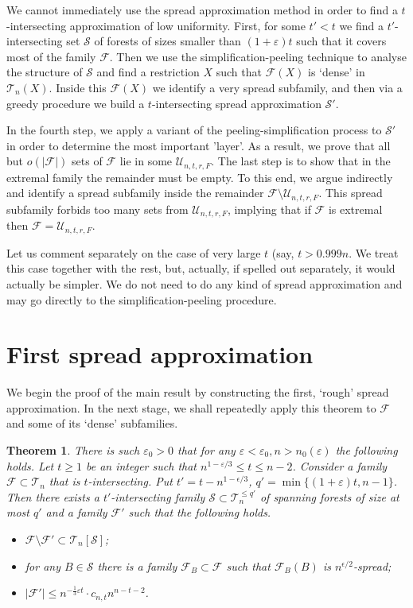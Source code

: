\documentclass[11pt,letterpaper]{amsart}
\newcommand{\eps}{\varepsilon}
\renewcommand{\le}{\leqslant}
\renewcommand{\ge}{\geqslant}
\newcommand{\ff}{\mathcal{F}}
\newcommand{\s}{\mathcal{S}}
\newcommand{\uu}{\mathcal U}
\newcommand{\T}{\mathcal{T}}
\newtheorem{theorem}{Theorem}
\begin{document}
We cannot immediately use the spread approximation method in order to find a $t$-intersecting approximation of low uniformity. First, for some $t'<t$ we find a $t'$-intersecting set $\s$ of forests of sizes smaller than $(1 + \eps)t$ such that it covers most of the family $\ff$. Then we use the simplification-peeling technique to analyse the structure of $\s$ and find a restriction $X$ such that $\ff(X)$ is `dense' in $\T_n(X)$. Inside this $\ff(X)$ we identify a very spread subfamily, and then via a greedy procedure we build a $t$-intersecting spread approximation $\s'$.

In the fourth step, we apply a variant of the peeling-simplification process to $\s'$ in order to determine the most important 'layer'. As a result, we prove that all but $o(|\ff|)$ sets of $\ff$ lie in some $\uu_{n, t, r, F}$. The last step is to show that in the extremal family the remainder must be empty. To this end, we argue indirectly and identify a spread subfamily inside  the remainder $\ff\setminus \uu_{n, t , r, F}$. This spread subfamily  forbids too many sets from $\uu_{n, t , r, F}$, implying that if $\ff$ is extremal then  $\ff = \uu_{n, t, r, F}.$

Let us comment separately on the case of very large $t$ (say, $t>0.999n$. We treat this case together with the rest, but, actually, if spelled out separately, it would actually be simpler. We do not need to do any kind of spread approximation and may go directly to the simplification-peeling procedure. 

\section{First spread approximation}

We begin the proof of the main result by constructing the first, `rough' spread approximation. In the next stage, we shall repeatedly apply this theorem to $\ff$ and some of its `dense' subfamilies.

\begin{theorem}\label{1SA}
  There is such $\eps_0 > 0$ that for any $\eps < \eps_0, n > n_0(\eps)$ the following holds. Let $t\ge1$ be an integer such that $n^{1-\eps/3} \le t \le n- 2$. Consider a family $\ff\subset \T_n$ that is $t$-intersecting.
  Put $t'= t-n^{1-\epsilon/3}$, $q' = \min\{(1 + \eps)t, n-1\}$. Then there exists a  $t'$-intersecting family $\mathcal S\subset \T_n^{\le q'}$ of spanning forests of size at most $q'$ and a family $\ff'$ such that the following holds.
  \begin{itemize}
    \item[(i)] $\ff\setminus \ff'\subset \T_n[\s]$;
    \item[(ii)] for any $B\in \s$ there is a family $\ff_B\subset \ff$ such that $\ff_B(B)$ is $n^{\epsilon/2}$-spread;
    \item[(iii)] $|\ff'|\le n^{-\frac 13\eps t}\cdot c_{n, t}n^{n-t-2}$.
  \end{itemize}
\end{theorem}
\end{document}
